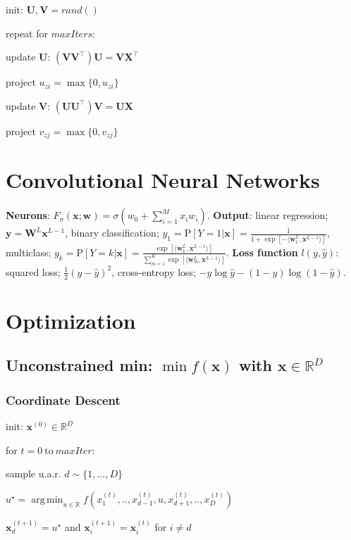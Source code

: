 \documentclass[a4paper, 11pt, landscape]{article}
\DeclareMathOperator*{\argmin}{arg\,min}
\begin{document}
\begin{multicols*}{3}
\begin{inparaenum}
	\item init: $\mathbf{U}, \mathbf{V} = rand()$
	\item repeat for $\mathit{maxIters}$:
	\item update $\mathbf{U}$: $(\mathbf{VV}^\top)\mathbf{U} = \mathbf{VX}^\top$
	\item project $u_{zi} = \max \{ 0, u_{zi} \}$
	\item update $\mathbf{V}$: $(\mathbf{UU}^\top)\mathbf{V} = \mathbf{UX}$
	\item project $v_{zj} = \max \{ 0, v_{zj} \}$
\end{inparaenum}

\section{Convolutional Neural Networks}
\textbf{Neurons}: $F_\sigma(\mathbf{x};\mathbf{w}) = \sigma(w_0 + \sum_{i=1}^M{x_iw_i})$. \textbf{Output}: linear regression; $\mathbf{y} = \mathbf{W}^L\mathbf{x}^{L-1}$, binary classification; $y_1 = \text{P}[Y=1|\mathbf{x}] = \frac{1}{1 + \exp[-\langle \mathbf{w}_1^L,\mathbf{x}^{L-1}\rangle]}$, multiclass; $y_k = \text{P}[Y=k|\mathbf{x}]= \frac{\exp[\langle \mathbf{w}_k^L,\mathbf{x}^{L-1}\rangle]}{\sum_{m=1}^{K}{\exp[\langle \mathbf{w}_m^L, \mathbf{x}^{L-1}\rangle]}}$. \textbf{Loss function} $l(y, \hat{y})$: squared loss; $\frac{1}{2}(y - \hat{y})^2$, cross-entropy loss; $-y \log \hat{y} - (1-y)\log(1-\hat{y})$.

\section{Optimization}

\subsection{Unconstrained min: $\min f(\mathbf{x})$ with $\mathbf{x} \in \mathbb{R}^D$
}

\subsubsection{Coordinate Descent}
\begin{inparaenum}
	\item init: $\mathbf{x}^{(0)} \in \mathbb{R}^D$
	\item for $t = 0 \ \text{to} \ \mathit{maxIter}$:
	\item sample u.a.r. $d \sim \{1, \ldots, D\}$
	\item $u^\star = \argmin_{u \in \mathbb{R}} f(x_1^{(t)}, .., x_{d-1}^{(t)}, u, x_{d+1}^{(t)}, .., x_D^{(t)})$
	\item $\mathbf{x}_d^{(t+1)} = u^\star$ and $\mathbf{x}_i^{(t+1)} = \mathbf{x}_i^{(t)}$ for $i \neq d$
\end{inparaenum}


\end{multicols*}
\end{document}
